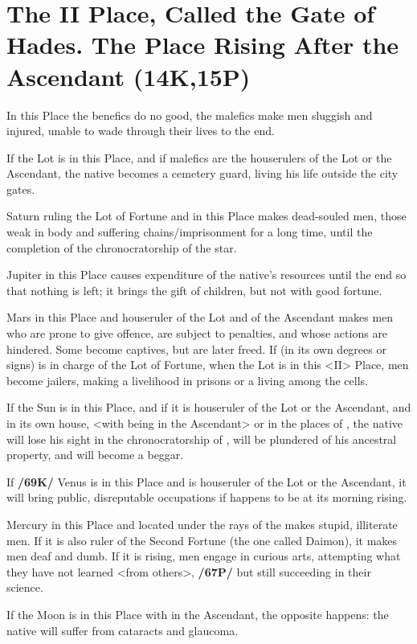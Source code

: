 \section{The II Place, Called the Gate of Hades. The Place Rising After the Ascendant (14K,15P)}
In this Place the benefics do no good, the malefics make men sluggish and injured, unable to wade through their lives to the end. 

If the Lot is in this Place, and if malefics are the houserulers of the Lot or the Ascendant, the native becomes a cemetery guard, living his life outside the city gates. 

Saturn ruling the Lot of Fortune and in this Place makes dead-souled men, those weak in body and suffering
chains/imprisonment for a long time, until the completion of the chronocratorship of the star. 

Jupiter in this Place causes expenditure of the native’s resources until the end so that nothing is left; it brings the gift of children, but not with good fortune. 

Mars in this Place and houseruler of the Lot and of the Ascendant makes men who are prone to give offence, are subject to penalties, and whose actions are hindered. Some become captives, but are later freed. If \Mars\xspace (in its own degrees or signs) is in charge of the Lot of Fortune, when the Lot is in this <II> Place, men become jailers, making a livelihood in prisons or a living among the cells. 

If the Sun is in this Place, and if it is houseruler of the Lot or the Ascendant, and in its own house, <with \Mars\xspace being in the Ascendant> or in the places of \Saturn, the native will lose his sight in the chronocratorship of \Mars, will be plundered of his ancestral property, and will become a beggar. 

If \textbf{/69K/} Venus is in this Place and is houseruler of the Lot or the Ascendant, it will bring public, disreputable occupations if \Venus\xspace happens to be at its morning rising. 

Mercury in this Place and located under the rays of the \Sun\xspace makes stupid, illiterate men. If it is also ruler of the Second Fortune (the one called Daimon), it makes men deaf and dumb. If it is rising, men engage in curious arts, attempting what they have not learned <from others>, \textbf{/67P/} but still succeeding in their science. 

If the Moon is in this Place with \Saturn\xspace in the Ascendant, the opposite happens: the native will suffer from cataracts and glaucoma.

\newpage